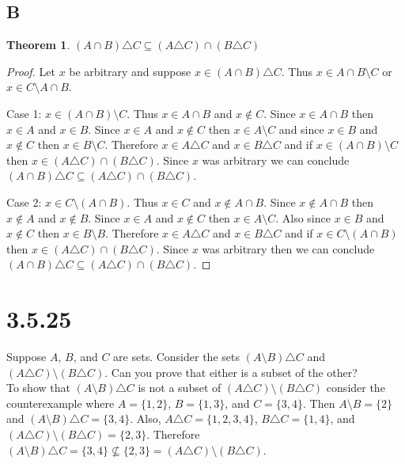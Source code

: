 \documentclass{article}
\newtheorem*{theorem}{Theorem}  %
\begin{document}
\subsection*{B}
\begin{theorem} $(A \cap B) \triangle C \subseteq (A \triangle C) \cap (B \triangle C)$
\end{theorem}

\begin{proof}
Let $x$ be arbitrary and suppose $x \in (A \cap B) \triangle C$. Thus $x \in A \cap B \setminus C$ or $x \in C \setminus A \cap B$.

Case 1: $x \in (A \cap B) \setminus C$. Thus $x \in A \cap B$ and $x \notin C$. Since $x \in A \cap B$ then $x \in A$ and $x \in B$. Since $x \in A$ and $x \notin C$ then $x \in A \setminus C$ and since $x \in B$ and $x \notin C$ then $x \in B \setminus C$. Therefore $x \in A \triangle C$ and $x \in B \triangle C$ and if $x \in (A \cap B) \setminus C$ then $x \in (A \triangle C) \cap (B \triangle C)$. Since $x$ was arbitrary we can conclude $(A \cap B) \triangle C \subseteq (A \triangle C) \cap (B \triangle C)$.

Case 2: $x \in C \setminus (A \cap B)$. Thus $x \in C$ and $x \notin A \cap B$. Since $x \notin A \cap B$ then $x \notin A$ and $x \notin B$. Since $x \in A$ and $x \notin C$ then $x \in A \setminus C$. Also since $x \in B$ and $x \notin C$ then $x \in B \setminus B$. Therefore $x \in A \triangle C$ and $x \in B \triangle C$ and if $x \in C \setminus (A \cap B)$ then $x \in (A \triangle C) \cap (B \triangle C)$. Since $x$ was arbitrary then we can conclude $(A \cap B) \triangle C \subseteq (A \triangle C) \cap (B \triangle C)$.
\end{proof}


\section*{3.5.25}
Suppose $A$, $B$, and $C$ are sets. Consider the sets $(A \setminus B) \triangle C$ and $(A \triangle C) \setminus (B \triangle C)$. Can you prove that either is a subset of the other? \\

To show that $(A \setminus B) \triangle C$ is not a subset of $(A \triangle C) \setminus (B \triangle C)$ consider the counterexample where $A = \{1,2\}$, $B = \{1,3\}$, and $C = \{3,4\}$. Then $A \setminus B = \{2\}$ and $(A \setminus B) \triangle C = \{3,4\}$. Also, $A \triangle C = \{1,2,3,4\}$, $B \triangle C = \{1,4\}$, and $(A \triangle C) \setminus (B \triangle C) = \{2,3\}$. Therefore $(A \setminus B) \triangle C = \{3, 4\} \nsubseteq \{2, 3\} = (A \triangle C) \setminus (B \triangle C)$. \\
\end{document}
